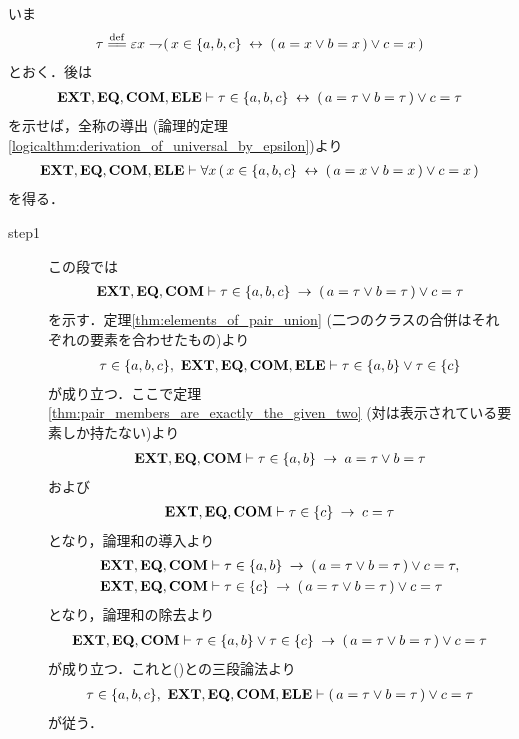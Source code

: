 	\begin{sketch}
		いま
		\begin{align}
			\tau \defeq \varepsilon x \negation (\, x \in \{a,b,c\} \lrarrow 
			(\, a = x \vee b = x\, ) \vee c = x\, )
		\end{align}
		とおく．後は
		\begin{align}
			\mbox{{\bf EXT}},\mbox{{\bf EQ}},\mbox{\bf COM},\mbox{{\bf ELE}} \vdash \tau \in \{a,b,c\} \hspace{0.25em}\leftrightarrow\hspace{0.25em} 
			(\, a = \tau \vee b = \tau\, ) \vee c = \tau
		\end{align}
		を示せば，全称の導出
		(論理的定理\ref{logicalthm:derivation_of_universal_by_epsilon})より
		\begin{align}
			\mbox{{\bf EXT}},\mbox{{\bf EQ}},\mbox{\bf COM},\mbox{{\bf ELE}} \vdash 
			\forall x\, (\, x \in \{a,b,c\} \hspace{0.25em}\leftrightarrow\hspace{0.25em} 
			(\, a = x \vee b = x\, ) \vee c = x\, )
		\end{align}
		を得る．
		\begin{description}
			\item[step1]
				この段では
				\begin{align}
					\mbox{{\bf EXT}},\mbox{{\bf EQ}},\mbox{\bf COM} \vdash \tau \in \{a,b,c\} \hspace{0.25em}\rightarrow\hspace{0.25em} 
					(\, a = \tau \vee b = \tau\, ) \vee c = \tau
				\end{align}
				を示す．定理\ref{thm:elements_of_pair_union}
				(二つのクラスの合併はそれぞれの要素を合わせたもの)より
				\begin{align}
					\tau \in \{a,b,c\},\ \mbox{{\bf EXT}},\mbox{{\bf EQ}},\mbox{\bf COM},\mbox{{\bf ELE}} \vdash 
					\tau \in \{a,b\} \vee \tau \in \{c\}
					\label{fom:triple_members_are_exactly_the_given_three_1}
				\end{align}
				が成り立つ．ここで定理\ref{thm:pair_members_are_exactly_the_given_two}
				(対は表示されている要素しか持たない)より
				\begin{align}
					\mbox{{\bf EXT}},\mbox{{\bf EQ}},\mbox{\bf COM} \vdash \tau \in \{a,b\} \hspace{0.25em}\rightarrow\hspace{0.25em} 
					a = \tau \vee b = \tau
				\end{align}
				および
				\begin{align}
					\mbox{{\bf EXT}},\mbox{{\bf EQ}},\mbox{\bf COM} \vdash \tau \in \{c\} \hspace{0.25em}\rightarrow\hspace{0.25em} c = \tau
				\end{align}
				となり，論理和の導入より
				\begin{align}
					\mbox{{\bf EXT}},\mbox{{\bf EQ}},\mbox{\bf COM} &\vdash \tau \in \{a,b\} \hspace{0.25em}\rightarrow\hspace{0.25em} 
					(\, a = \tau \vee b = \tau\, ) \vee c = \tau, \\
					\mbox{{\bf EXT}},\mbox{{\bf EQ}},\mbox{\bf COM} &\vdash \tau \in \{c\} \hspace{0.25em}\rightarrow\hspace{0.25em} 
					(\, a = \tau \vee b = \tau\, ) \vee c = \tau
				\end{align}
				となり，論理和の除去より
				\begin{align}
					\mbox{{\bf EXT}},\mbox{{\bf EQ}},\mbox{\bf COM} \vdash \tau \in \{a,b\} \vee \tau \in \{c\} \hspace{0.25em}\rightarrow\hspace{0.25em} 
					(\, a = \tau \vee b = \tau\, ) \vee c = \tau
				\end{align}
				が成り立つ．これと()との三段論法より
				\begin{align}
					\tau \in \{a,b,c\},\ \mbox{{\bf EXT}},\mbox{{\bf EQ}},\mbox{\bf COM},\mbox{{\bf ELE}} \vdash 
					(\, a = \tau \vee b = \tau\, ) \vee c = \tau
				\end{align}
				が従う．
				

\end{description}
\end{sketch}
